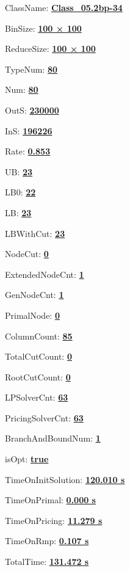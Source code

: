 \documentclass[11pt]{article}
\begin{document}
\pagestyle{empty}


ClassName: \underline{\textbf{Class_05.2bp-34}}
\par
BinSize: \underline{\textbf{100 × 100}}
\par
ReduceSize: \underline{\textbf{100 × 100}}
\par
TypeNum: \underline{\textbf{80}}
\par
Num: \underline{\textbf{80}}
\par
OutS: \underline{\textbf{230000}}
\par
InS: \underline{\textbf{196226}}
\par
Rate: \underline{\textbf{0.853}}
\par
UB: \underline{\textbf{23}}
\par
LB0: \underline{\textbf{22}}
\par
LB: \underline{\textbf{23}}
\par
LBWithCut: \underline{\textbf{23}}
\par
NodeCut: \underline{\textbf{0}}
\par
ExtendedNodeCnt: \underline{\textbf{1}}
\par
GenNodeCnt: \underline{\textbf{1}}
\par
PrimalNode: \underline{\textbf{0}}
\par
ColumnCount: \underline{\textbf{85}}
\par
TotalCutCount: \underline{\textbf{0}}
\par
RootCutCount: \underline{\textbf{0}}
\par
LPSolverCnt: \underline{\textbf{63}}
\par
PricingSolverCnt: \underline{\textbf{63}}
\par
BranchAndBoundNum: \underline{\textbf{1}}
\par
isOpt: \underline{\textbf{true}}
\par
TimeOnInitSolution: \underline{\textbf{120.010 s}}
\par
TimeOnPrimal: \underline{\textbf{0.000 s}}
\par
TimeOnPricing: \underline{\textbf{11.279 s}}
\par
TimeOnRmp: \underline{\textbf{0.107 s}}
\par
TotalTime: \underline{\textbf{131.472 s}}
\par
\newpage


\end{document}
